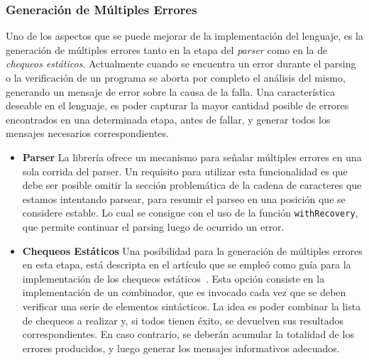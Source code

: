 \subsubsection{Generación de Múltiples Errores}

Uno de los aspectos que se puede mejorar de la implementación del lenguaje, es la generación de múltiples errores tanto en la etapa del \textit{parser} como en la de \textit{chequeos estáticos}.
Actualmente cuando se encuentra un error durante el parsing o la verificación de un programa se aborta por completo el análisis del mismo, generando un mensaje de error sobre la causa de la falla.
Una característica deseable en el lenguaje, es poder capturar la mayor cantidad posible de errores encontrados en una determinada etapa, antes de fallar, y generar todos los mensajes necesarios correspondientes.

\begin{itemize}

\item
\textbf{Parser}
La librería \Megaparsec{} ofrece un mecanismo para señalar múltiples errores en una sola corrida del parser.
Un requisito para utilizar esta funcionalidad es que debe ser posible omitir la sección problemática de la cadena de caracteres que estamos intentando parsear, para resumir el parseo en una posición que se considere estable.
Lo cual se consigue con el uso de la función \lstinline[style = haskell]{withRecovery}, que permite continuar el parsing luego de ocurrido un error.

\item
\textbf{Chequeos Estáticos}
Una posibilidad para la generación de múltiples errores en esta etapa, está descripta en el artículo que se empleó como guía para la implementación de los chequeos estáticos~\cite{MonadicTC}.
Esta opción consiste en la implementación de un combinador, que es invocado cada vez que se deben verificar una serie de elementos sintácticos.
La idea es poder combinar la lista de chequeos a realizar y, si todos tienen éxito, se devuelven sus resultados correspondientes.
En caso contrario, se deberán acumular la totalidad de los errores producidos, y luego generar los mensajes informativos adecuados.

\end{itemize}

